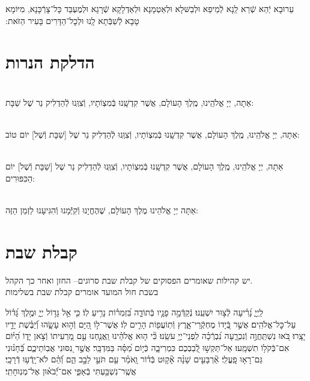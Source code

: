 \documentclass[twoside, openany, parskip=half, 11pt]{book}
\begin{document}
עֵרוּבָא יְֿהֵא שְֿׁרֵא לַֽנָא לְֿמֵיפֵא וּלְבַשּּׁלָא וּלְאַטְמָנָא וּלְאַדְלָקָא שְֿׁרָגָא וּלְמֶעְבַּד כָּל־צָרְֿכָּנָא, מִיּוֹמָא טָבָא לְֿשַׁבְּֿתָא לָֽנוּ וּלְכׇל־הַדָּרִים בָּעִיר הַזּׂאת:‏


\vspace{\baselineskip}
{\let\clearpage\relax
\chapter[הדלקת הנרות שבת ויום טוב]{ הדלקת הנרות }}

\\
אַתָה, יְיָ אֱלֹהֵֽינוּ, מֶֽלֶךְ הָעוֹלָם, אֲשֶׁר קִדְשָֽׁנוּ בְּֿמִצְוֹתָיו, וְֿצִוְּֽנוּ לְֿהַדְלִיק נֵר שֶׁל שַׁבָּת:

\\
אַתָה, יְיָ אֱלֹהֵֽינוּ, מֶֽלֶךְ הָעוֹלָם, אֲשֶׁר קִדְשָֽׁנוּ בְּֿמִצְוֹתָיו, וְֿצִוְּֽנוּ לְֿהַדְלִיק נֵר שֶׁל
[שַׁבָּת וְֿשֶׁל] יוֹם טוֹב:

\\
אַתָה, יְיָ אֱלֹהֵֽינוּ, מֶֽלֶךְ הָעוֹלָם, אֲשֶׁר קִדְשָֽׁנוּ בְּֿמִצְוֹתָיו, וְֿצִוְּֽנוּ לְֿהַדְלִיק נֵר שֶׁל
[שַׁבָּת וְֿשֶׁל] יוֹם הַכִּפּוּרִים:

\\
אַתָּה יְיָ אֱלֹהֵינוּ מֶלֶךְ הָעוֹלָם, שֶׁהֶחֱיָנוּ וְֿקִיְּֿֿמָנוּ וְֿהִגִּיעָנוּ לַזְמַן הַזֶּה:



\chapter[קבלת שבת]{ קבלת שבת }
\label{kabalas_shabbos}


\begin{scriptsize}
\textsf{יש קהילות שאומרים הפסוקים של קבלת שבת סרוגים-- החזן ואחר כך הקהל.\\
בשבת חול המועד אומרים קבלת שבת בשלימות}

\end{scriptsize}

לַֽיְיָ֑ נָ֝רִ֗יעָה לְֿצ֣וּר יִשְׁעֵֽנוּ׃
נְֿקַדְּֿמָ֣ה פָנָ֣יו בְּֿתוֹדָ֑ה בִּ֝זְמִר֗וֹת נָרִ֥יעַ לֽוֹ׃
כִּ֤י אֵ֣ל גָּד֣וֹל יְיָ֑ וּמֶ֥לֶךְ גָּ֝ד֗וֹל עַל־כׇּל־אֱלֹהִֽים׃
אֲשֶׁ֣ר בְּֿ֭יָדוֹ מֶחְקְֿרֵי־אָ֑רֶץ וְֿתֽוֹעֲפ֖וֹת הָרִ֣ים לֽוֹ׃
אֲשֶׁר־ל֣וֹ הַ֭יָּם וְֿה֣וּא עָשָׂ֑הוּ וְֿ֝יַבֶּ֗שֶׁת יָדָ֥יו יָצָֽרוּ׃
בֹּ֭אוּ נִשְׁתַּֽחֲוֶ֣ה וְֿנִכְרָ֑עָה נִ֝בְרְֿכָ֗ה לִֽפְנֵי־יְיָ֥ עֹשֵֽׂנוּ׃
כִּ֘י ה֤וּא אֱלֹהֵ֗ינוּ וַֽאֲנַ֤חְנוּ עַ֣ם מַ֭רְעִיתוֹ וְֿצֹ֣אן יָד֑וֹ הַ֝יּ֗וֹם אִם־בְּֿקֹל֥וֹ תִשְׁמָֽעוּ׃
אַל־תַּקְשׁ֣וּ לְֿ֭בַבְכֶם כִּמְרִיבָ֑ה כְּֿי֥וֹם מַ֝סָּ֗ה בַּמִּדְבָּֽר׃
אֲשֶׁ֣ר נִ֭סּוּנִי אֲבֽוֹתֵיכֶ֑ם בְּֿ֝חָנ֗וּנִי גַּם־רָא֥וּ פָֽעֳלִֽי׃
אַ֘רְבָּעִ֤ים שָׁנָ֨ה אָ֘ק֤וּט בְּֿד֗וֹר וָֽאֹמַ֗ר עַ֤ם תֹּעֵ֣י לֵבָ֣ב הֵ֑ם וְֿ֝הֵ֗ם לֹא־יָֽדְֿע֥וּ דְֿרָכָֽי׃
אֲשֶֽׁר־נִשְׁבַּ֥עְתִּי בְֿאַפִּ֑י אִם־יְֿ֝בֹא֗וּן אֶל־מְנֽוּחָתִֽי׃
\end{document}
